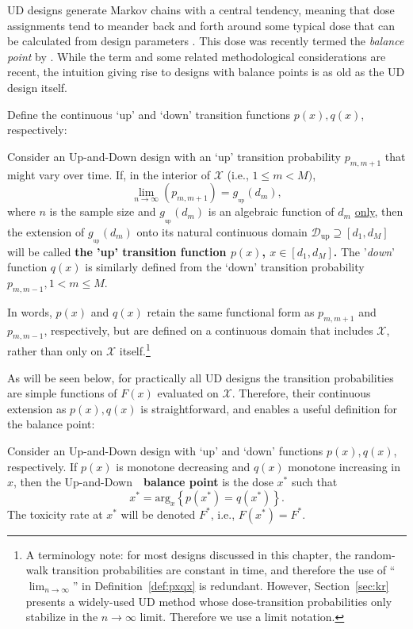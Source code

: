 UD designs generate Markov chains with a central tendency, meaning that dose assignments tend to meander back and forth around some typical dose that can be calculated from design parameters \citep{Durh:Flou:rand:1994,Hugh:Rand:1995}. This dose was recently termed the \emph{balance point} by \cite{Oron:Hoff:thek:2009}. While the term and some related methodological considerations are recent, the intuition giving rise to designs with balance points is as old as the UD design itself.

Define the continuous `up' and `down' transition functions $p(x),q(x)$, respectively:

\begin{defn}\label{def:pxqx}
Consider an Up-and-Down design with an `up' transition probability  $p_{m,m+1}$ that might vary over time. If, in the interior of $\mathcal{X}$ (i.e., $1\leq m<M)$, $$\lim_{n\to\infty}\left(p_{m,m+1}\right)=g_{_\mathrm{up}}\left(d_m\right),$$
where $n$ is the sample size and $g_{_\mathrm{up}}\left(d_m\right)$ is an algebraic function of $d_m$  \underline{only}, then the extension of $g_{_\mathrm{up}}\left(d_m\right)$ onto its natural continuous domain $\mathcal{D}{_\mathrm{up}}\supseteq\left[d_1,d_M\right]$ will be called \textbf{the 'up' transition function $p(x)$, $x\in\left[d_1,d_M\right]$.} The '\emph{down}' function $q(x)$ is similarly defined from the `down' transition probability $p_{m,m-1}, 1<m\leq M$.
\end{defn}

In words, $p(x)$ and $q(x)$ retain the same functional form as $p_{m,m+1}$ and $p_{m,m-1}$, respectively, but are defined on a continuous domain that includes $\mathcal{X}$, rather than only on $\mathcal{X}$ itself.\footnote{A terminology note: for most designs discussed in this chapter, the random-walk transition probabilities are constant in time, and therefore the use of ``$\lim_{n\to\infty}$'' in Definition~\ref{def:pxqx} is redundant. However, Section~\ref{sec:kr} presents a widely-used UD method whose dose-transition probabilities only stabilize in the $n\to\infty$ limit. Therefore we use a limit notation.}

As will be seen below, for practically all UD designs the transition probabilities are simple functions of $F(x)$ evaluated on $\mathcal{X}$. Therefore, their continuous extension as $p(x),q(x)$ is straightforward, and enables a useful definition for the balance point:

\begin{defn}\label{def:targ}  Consider an Up-and-Down design with `up' and `down' functions $p(x),q(x)$, respectively. If $p(x)$ is monotone decreasing and $q(x)$ monotone increasing in $x$,
then the Up-and-Down\ \  {\bf balance point} is the dose $x^*$ such that
\begin{equation}\label{eq:deftarget}
x^*=\mathrm{arg}_x \left\{p(x^*)=q(x^*)\right\}.
\end{equation}
The toxicity rate at $x^*$ will be denoted $F^*$, i.e., $F(x^*)=F^*$.
\end{defn}

